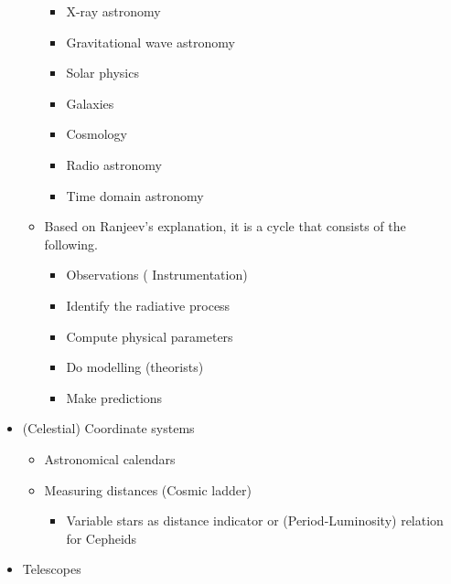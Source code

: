 \documentclass{../template/texnote}
\begin{document}
\begin{itemize}
\begin{itemize}
    \begin{itemize}
    \tightlist
    \item
      X-ray astronomy
    \item
      Gravitational wave astronomy
    \item
      Solar physics
    \item
      Galaxies
    \item
      Cosmology
    \item
      Radio astronomy
    \item
      Time domain astronomy
    \end{itemize}
  \item
    Based on Ranjeev's explanation, it is a cycle that consists of the
    following.

    \begin{itemize}
    \tightlist
    \item
      Observations ( Instrumentation)
    \item
      Identify the radiative process
    \item
      Compute physical parameters
    \item
      Do modelling (theorists)
    \item
      Make predictions
    \end{itemize}
  \end{itemize}
\item
  (Celestial) Coordinate systems

  \begin{itemize}
  \item
    Astronomical calendars
  \item
    Measuring distances (Cosmic ladder)

    \begin{itemize}
    \tightlist
    \item
      Variable stars as distance indicator or (Period-Luminosity)
      relation for Cepheids
    \end{itemize}
  \end{itemize}
\item
  Telescopes
\end{itemize}
    \printbibliography
\end{document}
